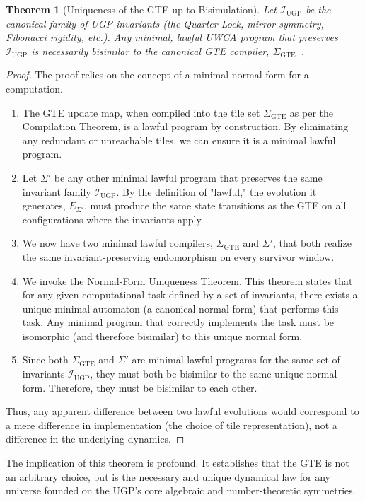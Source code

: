 \documentclass[12pt]{article}
\newtheorem{theorem}{Theorem}[section]
\numberwithin{equation}{section}
\begin{document}
\begin{theorem}[Uniqueness of the GTE up to Bisimulation]
\label{thm:gte_uniqueness}
Let $\mathcal{I}_{\text{UGP}}$ be the canonical family of UGP invariants (the Quarter-Lock, mirror symmetry, Fibonacci rigidity, etc.). Any minimal, lawful UWCA program that preserves $\mathcal{I}_{\text{UGP}}$ is necessarily bisimilar to the canonical GTE compiler, $\Sigma_{\mathrm{GTE}}$~\cite{SpivackUGPFormalization,ugp-lean}.
\end{theorem}
\begin{proof}
The proof relies on the concept of a minimal normal form for a computation.
\begin{enumerate}[leftmargin=*]
    \item The GTE update map, when compiled into the tile set $\Sigma_{\mathrm{GTE}}$ as per the Compilation Theorem, is a lawful program by construction. By eliminating any redundant or unreachable tiles, we can ensure it is a minimal lawful program.
    \item Let $\Sigma'$ be any other minimal lawful program that preserves the same invariant family $\mathcal{I}_{\text{UGP}}$. By the definition of "lawful," the evolution it generates, $E_{\Sigma'}$, must produce the same state transitions as the GTE on all configurations where the invariants apply.
    \item We now have two minimal lawful compilers, $\Sigma_{\mathrm{GTE}}$ and $\Sigma'$, that both realize the same invariant-preserving endomorphism on every survivor window.
    \item We invoke the Normal-Form Uniqueness Theorem. This theorem states that for any given computational task defined by a set of invariants, there exists a unique minimal automaton (a canonical normal form) that performs this task. Any minimal program that correctly implements the task must be isomorphic (and therefore bisimilar) to this unique normal form.
    \item Since both $\Sigma_{\mathrm{GTE}}$ and $\Sigma'$ are minimal lawful programs for the same set of invariants $\mathcal{I}_{\text{UGP}}$, they must both be bisimilar to the same unique normal form. Therefore, they must be bisimilar to each other.
\end{enumerate}
Thus, any apparent difference between two lawful evolutions would correspond to a mere difference in implementation (the choice of tile representation), not a difference in the underlying dynamics.
\end{proof}
The implication of this theorem is profound. It establishes that the GTE is not an arbitrary choice, but is the necessary and unique dynamical law for any universe founded on the UGP's core algebraic and number-theoretic symmetries.
\end{document}
